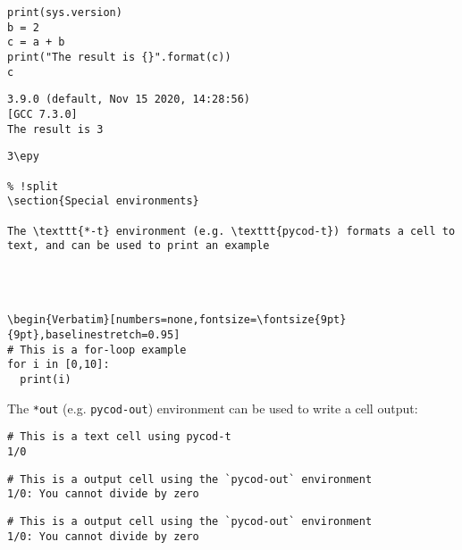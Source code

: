 \documentclass[%
oneside,                 %
final,                   %
chapterprefix=true,      %
open=right,              %
10pt]{book}
\begin{document}
\begin{Verbatim}[numbers=none,fontsize=\fontsize{9pt}{9pt},baselinestretch=0.95]
print(sys.version)
b = 2
c = a + b
print("The result is {}".format(c))
c

\end{Verbatim}

\begin{Verbatim}[numbers=none,fontsize=\fontsize{9pt}{9pt},baselinestretch=0.95]
3.9.0 (default, Nov 15 2020, 14:28:56) 
[GCC 7.3.0]
The result is 3
\end{Verbatim}
\begin{Verbatim}[numbers=none,fontsize=\fontsize{9pt}{9pt},baselinestretch=0.95]
3\epy

% !split
\section{Special environments}

The \texttt{*-t} environment (e.g. \texttt{pycod-t}) formats a cell to text, and can be used to print an example




\begin{Verbatim}[numbers=none,fontsize=\fontsize{9pt}{9pt},baselinestretch=0.95]
# This is a for-loop example
for i in [0,10]:
  print(i)

\end{Verbatim}


The \texttt{*out}  (e.g. \texttt{pycod-out}) environment can be used to write a cell output:



\begin{Verbatim}[numbers=none,fontsize=\fontsize{9pt}{9pt},baselinestretch=0.95]
# This is a text cell using pycod-t
1/0

\end{Verbatim}




\begin{Verbatim}[numbers=none,fontsize=\fontsize{9pt}{9pt},baselinestretch=0.95]
# This is a output cell using the `pycod-out` environment
1/0: You cannot divide by zero

\end{Verbatim}

\begin{Verbatim}[numbers=none,fontsize=\fontsize{9pt}{9pt},baselinestretch=0.95]
# This is a output cell using the `pycod-out` environment
1/0: You cannot divide by zero
\end{Verbatim}
\end{document}
